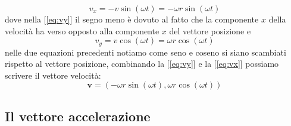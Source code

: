 \documentclass[a4paper,10pt,oneside]{article}
\begin{document}
\begin{equation}\label{eq:vx}
 v_x=-v\sin(\omega t)=-\omega r \sin(\omega t)
\end{equation}
dove nella [\ref{eq:vy}] il segno meno è dovuto al fatto che la componente $x$ della velocità ha verso opposto alla componente $x$ del vettore posizione e
\begin{equation}\label{eq:vy}
 v_y=v\cos(\omega t)=\omega r\cos (\omega t)
\end{equation}
nelle due equazioni precedenti notiamo come seno e coseno si siano scambiati rispetto al vettore posizione, combinando la  [\ref{eq:vy}] e la [\ref{eq:vx}] possiamo scrivere il vettore velocità:
\begin{equation}
 \mathbf{v}=\left(-\omega r \sin (\omega t),\omega r \cos (\omega t)\right)
\end{equation}

\subsection*{Il vettore accelerazione}
\end{document}
